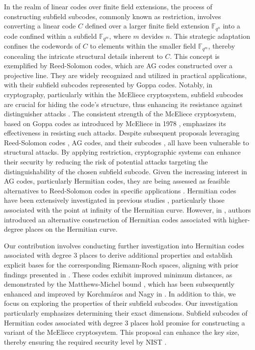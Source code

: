 \documentclass[11pt]{amsart}
\theoremstyle{plain}
\theoremstyle{definition}
\theoremstyle{remark}
\begin{document}
In the realm of linear codes over finite field extensions, the process of constructing subfield subcodes, commonly known as restriction, involves converting a linear code $C$ defined over a larger finite field extension $\mathbb{F}_{q^n}$ into a code confined within a subfield $\mathbb{F}_{q^m}$, where $m$ devides $n$. This strategic adaptation confines the codewords of $C$ to elements within the smaller field $\mathbb{F}_{q^m}$, thereby concealing the intricate structural details inherent to $C$. This concept is exemplified by Reed-Solomon codes, which are AG codes constructed over a projective line. They are  widely recognized and utilized in practical applications, with their subfield subcodes represented by Goppa codes. Notably, in cryptography, particularly within the McEliece cryptosystem, subfield subcodes are crucial for hiding the code's structure, thus enhancing its resistance against distinguisher attacks \cite{sendrier2002security, faugere2013distinguisher}. The consistent strength of the McEliece cryptosystem, based on Goppa codes as introduced by McEliece in 1978 \cite{mceliece1978public}, emphasizes its effectiveness in resisting such attacks. Despite subsequent proposals leveraging Reed-Solomon codes \cite{couvreur2014distinguisher}, AG codes, and their subcodes \cite{couvreur2017cryptanalysis}, all have been vulnerable to structural attacks. By applying restriction, cryptographic systems can enhance their security by reducing the risk of potential attacks targeting the distinguishability of the chosen subfield subcode. Given the increasing interest in AG codes, particularly Hermitian codes, they are being assessed as feasible alternatives to Reed-Solomon codes in specific applications \cite{macdonald2003hermitian}. Hermitian codes have been extensively investigated in previous studies \cite{stichtenoth1988note, little1997structure, yang1992true,korchmaros2019codes, ren2004structure}, particularly those associated with the point at infinity of the Hermitian curve. However, in \cite{korchmaros2013hermitian, matthews2005one}, authors introduced an alternative construction of Hermitian codes associated with higher-degree places on the Hermitian curve. 

Our contribution involves conducting further investigation into Hermitian codes associated with degree $3$ places to derive additional properties and establish explicit bases for the corresponding Riemann-Roch spaces, aligning with prior findings presented in \cite{korchmaros2013hermitian}. These codes exhibit improved minimum distances, as demonstrated by the Matthews-Michel bound \cite{matthews2005one}, which has been subsequently enhanced and improved by Korchm\'aros and Nagy in \cite{korchmaros2013hermitian}. In addition to this, we focus on exploring the properties of their subfield subcodes. Our investigation particularly emphasizes determining their exact dimensions. Subfield subcodes of Hermitian codes associated with degree $3$ places hold promise for constructing a variant of the McEliece cryptosystem. This proposal can enhance the key size, thereby ensuring the required security level by NIST \cite{Nist}.
\end{document}
